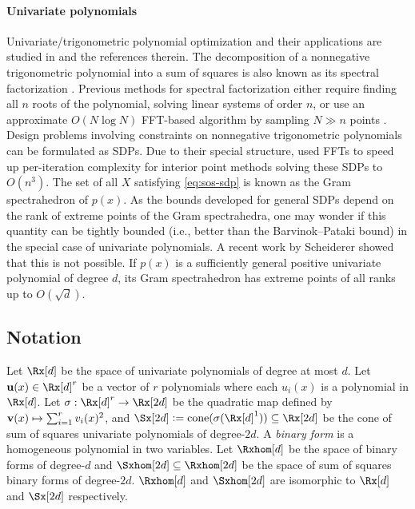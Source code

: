\documentclass[final,onefignum,onetabnum]{siamart220329}
\begin{document}
\paragraph{Univariate polynomials} Univariate/trigonometric polynomial optimization
  and their applications are studied in \cite{wu1999fir, roh2006discrete,
    dumitrescu2007positive} and the references therein. The decomposition of a
  nonnegative trigonometric polynomial into a sum of squares is also known as
  its spectral factorization \cite[Theorem
  1.1]{dumitrescu2007positive}. Previous methods for spectral factorization
  either require finding all $n$ roots of the polynomial, solving linear systems
  of order $n$, or use an approximate $O(N \log N)$ FFT-based algorithm by
  sampling $N \gg n$ points \cite{wu1999fir,dumitrescu2007positive}. Design
  problems involving constraints on nonnegative trigonometric polynomials can
  be formulated as SDPs. Due to their special structure, \cite{roh2006discrete}
  used FFTs to speed up per-iteration complexity for interior point methods
  solving these SDPs to $O(n^3)$.
  The set of all $X$ satisfying \eqref{eq:sos-sdp} is known as the Gram
  spectrahedron of $p(x)$. As the bounds developed for general SDPs depend on
  the rank of extreme points of the Gram spectrahedra, one may wonder if this
  quantity can be tightly bounded (i.e., better than the Barvinok--Pataki bound)
  in the special case of univariate polynomials. A recent work by Scheiderer
  \cite{scheiderer2022extreme} showed that this is not possible. If $p(x)$ is a
  sufficiently general positive univariate polynomial of degree $d$, its Gram
  spectrahedron has extreme points of all ranks up to $O(\sqrt{d})$.

\subsection{Notation}
Let $\Rx[d]$ be the space of univariate polynomials of degree at most $d$. Let
$\vecpoly{u} \in \Rx[d]^r$ be a vector of $r$ polynomials where each $u_i(x)$ is
a polynomial in $\Rx[d]$. Let $\sig: \Rx[d]^r \rightarrow \Rx[2d]$ be the
quadratic map defined by $\boldsymbol{\mathbf{v}}(x) \mapsto \sum_{i=1}^r v_i(x)^2$, and
$\Sx[2d] \defeq \cone(\sig(\Rx[d]^1)) \subseteq \Rx[2d]$ be the cone of sum of
squares univariate polynomials of degree-$2d$. A \emph{binary form} is a
homogeneous polynomial in two variables. Let $\Rxhom[d]$ be the space of binary
forms of degree-$d$ and $\Sxhom[2d] \subseteq \Rxhom[2d]$ be the space of sum of
squares binary forms of degree-$2d$. $\Rxhom[d]$ and $\Sxhom[2d]$ are isomorphic
to $\Rx[d]$ and $\Sx[2d]$ respectively.
\end{document}
